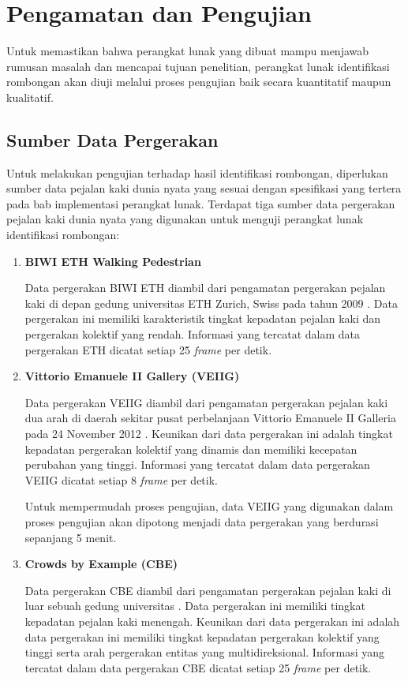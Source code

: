 \chapter{Pengamatan dan Pengujian}
\label{chap:pengujian}

Untuk memastikan bahwa perangkat lunak yang dibuat mampu menjawab rumusan masalah dan mencapai tujuan penelitian, perangkat lunak identifikasi rombongan akan diuji melalui proses pengujian baik secara kuantitatif maupun kualitatif.

\section{Sumber Data Pergerakan}
\label{bab6:data-pergerakan}

Untuk melakukan pengujian terhadap hasil identifikasi rombongan, diperlukan sumber data pejalan kaki dunia nyata yang sesuai dengan spesifikasi yang tertera pada bab implementasi perangkat lunak. Terdapat tiga sumber data pergerakan pejalan kaki dunia nyata yang digunakan untuk menguji perangkat lunak identifikasi rombongan:

\begin{enumerate}
    \item \textbf{BIWI ETH Walking Pedestrian}
    
    Data pergerakan BIWI ETH diambil dari pengamatan pergerakan pejalan kaki di depan gedung universitas ETH Zurich, Swiss pada tahun 2009 \cite{pellegrini:eth}. Data pergerakan ini memiliki karakteristik tingkat kepadatan pejalan kaki dan pergerakan kolektif yang rendah. Informasi yang tercatat dalam data pergerakan ETH dicatat setiap 2\.5 \textit{frame} per detik.
    
    \item \textbf{Vittorio Emanuele II Gallery (VEIIG)}
    
    Data pergerakan VEIIG diambil dari pengamatan pergerakan pejalan kaki dua arah di daerah sekitar pusat perbelanjaan Vittorio Emanuele II Galleria pada 24 November 2012 \cite{bandini:gveii}. Keunikan dari data pergerakan ini adalah tingkat kepadatan pergerakan kolektif yang dinamis dan memiliki kecepatan perubahan yang tinggi. Informasi yang tercatat dalam data pergerakan VEIIG dicatat setiap 8 \textit{frame} per detik.
    
    Untuk mempermudah proses pengujian, data VEIIG yang digunakan dalam proses pengujian akan dipotong menjadi data pergerakan yang berdurasi sepanjang 5 menit.
    
    \item \textbf{Crowds by Example (CBE)}
    
    Data pergerakan CBE diambil dari pengamatan pergerakan pejalan kaki di luar sebuah gedung universitas \cite{solera:06:range-reference}. Data pergerakan ini memiliki tingkat kepadatan pejalan kaki menengah. Keunikan dari data pergerakan ini adalah data pergerakan ini memiliki tingkat kepadatan pergerakan kolektif yang tinggi serta arah pergerakan entitas yang multidireksional.
    Informasi yang tercatat dalam data pergerakan CBE dicatat setiap 25 \textit{frame} per detik.
\end{enumerate}

